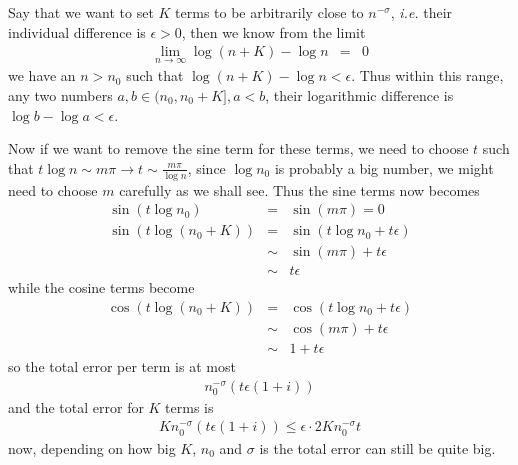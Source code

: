 \documentclass[aps,preprint,preprintnumbers,nofootinbib,showpacs,prd]{revtex4-1}
\newcommand{\ie}{{\it i.e.} }
\newcommand{\nbea}{\begin{eqnarray*}}
\newcommand{\neea}{\end{eqnarray*}}
\begin{document}
Say that we want to set $K$ terms to be arbitrarily close to $n^{-\sigma}$, \ie their individual difference is $\epsilon > 0$, then we know from the limit
%
\nbea
\lim_{n\to\infty} \log (n + K) - \log n & = & 0
\neea
%
we have an $n > n_0$ such that $\log (n + K) - \log n < \epsilon$. Thus within this range, any two numbers $a,b \in (n_0, n_0 + K], a < b$, their logarithmic difference is $\log b - \log a < \epsilon$.

Now if we want to remove the sine term for these terms, we need to choose $t$ such that $t \log n \sim m\pi \to t \sim\frac{m\pi}{\log n}$, since $\log n_0$ is probably a big number, we might need to choose $m$ carefully as we shall see. Thus the sine terms now becomes
%
\nbea
\sin(t \log n_0) & = & \sin (m\pi) = 0 \\
\sin(t \log (n_0 + K)) & = & \sin (t \log n_0 + t\epsilon) \\
& \sim & \sin(m\pi) + t\epsilon \\
& \sim & t\epsilon
\neea
%
while the cosine terms become
%
\nbea
\cos(t \log (n_0 + K)) & = & \cos(t \log n_0 + t\epsilon) \\
& \sim & \cos(m\pi) + t\epsilon \\
& \sim & 1 + t\epsilon
\neea
%
so the total error per term is at most
%
\nbea
n_0^{-\sigma}(t\epsilon(1 + i))
\neea
%
and the total error for $K$ terms is
%
\nbea
K n_0^{-\sigma}(t\epsilon(1 + i)) \le \epsilon \cdot 2 K n_0^{-\sigma} t 
\neea
%
now, depending on how big $K$, $n_0$ and $\sigma$ is the total error can still be quite big.
\end{document}
